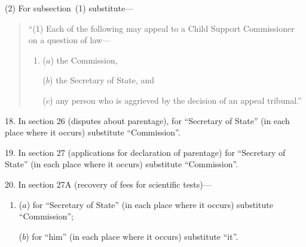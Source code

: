 \documentclass[12pt,a4paper]{article}
\begin{document}
(2) For subsection~(1) substitute—
\begin{quotation}
“(1) Each of the following may appeal to a Child Support Commissioner on a question of law—
\begin{enumerate}\item[]
($a$) the Commission,

($b$) the Secretary of State, and

($c$) any person who is aggrieved by the decision of an appeal tribunal.”
\end{enumerate}
\end{quotation}

%
%
%

%

\medskip

18. In section 26 (disputes about parentage), for “Secretary of State” (in each place where it occurs) substitute “Commission”.

\medskip

19. In section 27 (applications for declaration of parentage) for “Secretary of State” (in each place where it occurs) substitute “Commission”.

\medskip

20. In section 27A (recovery of fees for scientific tests)—
\begin{enumerate}\item[]
($a$) for “Secretary of State” (in each place where it occurs) substitute “Commission”;

($b$) for “him” (in each place where it occurs) substitute “it”.
\end{enumerate}
\end{document}
